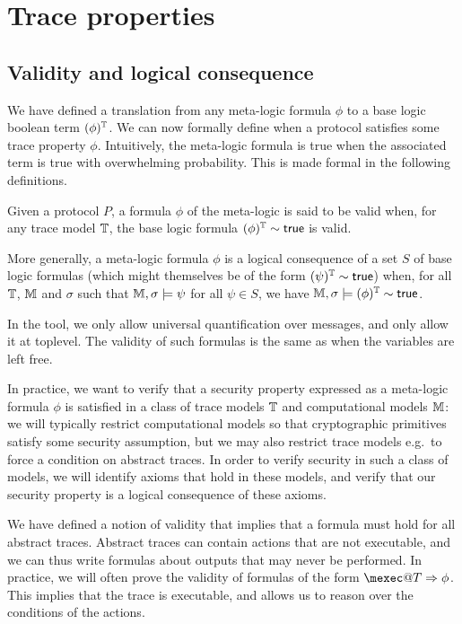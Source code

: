 \section{Trace properties}

\subsection{Validity and logical consequence}

We have defined a translation from any meta-logic formula $\phi$ to a base logic
boolean term $(\phi)^{\mathbb{T}}$. We can now formally define when a protocol
satisfies some trace property $\phi$.  Intuitively, the meta-logic formula is
true when the associated term is true with overwhelming probability. This is
made formal in the following definitions.


\begin{definition}
  Given a protocol $P$, a formula $\phi$ of the meta-logic is said to be valid
  when, for any trace model $\mathbb{T}$, the base logic formula
  $(\phi)^{\mathbb{T}} \sim \textsf{true}$ is valid.

  More generally, a meta-logic formula $\phi$ is a
  logical consequence of a set $S$ of base logic formulas
  (which might themselves be of the form $(\psi)^{\mathbb{T}} \sim \textsf{true}$)
  when, for all $\mathbb{T}$, $\mathbb{M}$ and $\sigma$ such that
  $\mathbb{M},\sigma \models \psi$ for all $\psi\in S$,
  we have
  $\mathbb{M},\sigma \models(\phi)^{\mathbb{T}}\sim\mathsf{true}$.
\end{definition}

\begin{remark}
  In the tool, we only allow universal quantification over messages, and
  only allow it at toplevel. The validity of such formulas is the same as
  when the variables are left free.
\end{remark}

In practice, we want to verify that a security property expressed as a
meta-logic formula $\phi$ is satisfied in a class of trace models
$\mathbb{T}$ and computational models $\mathbb{M}$: we will typically restrict computational
models so that cryptographic primitives satisfy some security assumption,
but we may also restrict trace models e.g.\ to force a condition on
abstract traces. In order to verify security in such a class of models,
we will identify axioms that hold in these models, and verify that our
security property is a logical consequence of these axioms.

\begin{remark}
  We have defined a notion of validity that implies that a formula must hold for all abstract traces. Abstract traces can contain actions that are not executable, and we can thus write formulas about outputs that may never be performed. In practice, we will often prove the validity of formulas of the form $\mexec@T \Rightarrow \phi$. This implies that the trace is executable, and allows us to reason over the conditions of the actions.
\end{remark}

